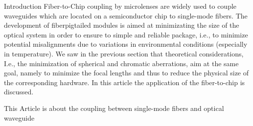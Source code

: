 
Introduction Fiber-to-Chip coupling by microlenses are widely used to couple waveguides which are located on a semiconductor chip to single-mode fibers. The development of fiberpigtailed modules is aimed at minimizating the size of the optical system in order to ensure to simple and reliable package, i.e., to minimize potential misalignments due to variations in environmental conditions (especially in temperature). We saw in the previous section that theoretical considerations, I.e., the minimization of spherical and chromatic aberrations, aim at the same goal, namely to minimize the focal lengths and thus to reduce the physical size of the corresponding hardware.  In this article the application of the fiber-to-chip is discussed.

This Article is about the coupling between single-mode fibers and optical waveguide  